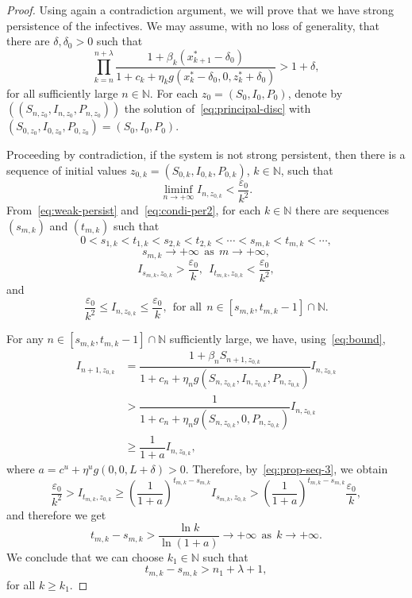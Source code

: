 \documentclass[reqno]{amsart}
\renewcommand{\le}{\leqslant}
\renewcommand{\ge}{\geqslant}
\newcommand{\eps}{\varepsilon}
\newcommand{\N}{\ensuremath{\mathds N}}
\begin{document}
{{\begin{proof}
Using again a contradiction argument, we will prove that we have strong persistence of the infectives. We may assume, with no loss of generality, that
there are $\delta,\delta_0>0$ such that
\begin{equation}\label{eq:condi-per2}
\prod_{k=n}^{n+\lambda} \dfrac{1+\beta_k(x^*_{k+1}-\delta_0)}{1+c_k+\eta_kg(x^*_k-\delta_0,0,z^*_k+\delta_0)}>1+\delta,
\end{equation}
for all sufficiently large $n \in \N$. For each $z_0=(S_0,I_0,P_0)$, denote by $((S_{n,z_0},I_{n,z_0},P_{n,z_0}))$ the solution of~\eqref{eq:principal-disc}  with {$(S_{0,z_0},I_{0,z_0},P_{0,z_0})=(S_0,I_0,P_0)$}.

Proceeding by contradiction, if the system is not strong persistent, then there is a sequence of initial values $z_{0,k}=(S_{0,k},I_{0,k},P_{0,k})$, $k \in\N$, such that
    \begin{equation}\label{eq:contrad-2}
    \liminf_{n \to +\infty} I_{n,z_{0,k}} < \frac{\eps_0}{k^2}.
    \end{equation}
From~\eqref{eq:weak-persist} and~\eqref{eq:condi-per2}, for each $k \in\N$ there are sequences $(s_{m,k})$ and $(t_{m,k})$ such that
\begin{equation}\label{eq:prop-seq-1}
0<s_{1,k}<t_{1,k}<s_{2,k}<t_{2,k}<\cdots<s_{m,k}<t_{m,k}<\cdots,
\end{equation}
\begin{equation}\label{eq:prop-seq-2}
s_{m,k} \to +\infty \ \ \text{as} \ \ m \to +\infty,
\end{equation}
\begin{equation}\label{eq:prop-seq-3}
I_{s_{m,k},z_{0,k}}>\dfrac{\eps_0}{k}, \ \  I_{t_{m,k},z_{0,k}}<\dfrac{\eps_0}{k^2},
\end{equation}
and
\begin{equation}\label{eq:prop-seq-4}
\frac{\eps_0}{k^2}\le I_{n,z_{0,k}}\le \frac{\eps_0}{k}, \ \  \text{for all} \ \ n \in [s_{m,k},t_{m,k}-1]\cap\N.
\end{equation}

For any $n \in [s_{m,k},t_{m,k}-1]\cap\N$ sufficiently large, we have, using~\eqref{eq:bound},
\[
\begin{split}
I_{n+1,z_{0,k}}
&=\dfrac{1+\beta_nS_{n+1,z_{0,k}}}{1+c_n+\eta_n g(S_{n,z_{0,k}},I_{n,z_{0,k}},P_{n,z_{0,k}})}I_{n,z_{0,k}}\\
& > \dfrac{1}{1+c_n+\eta_n g(S_{n,z_{0,k}},0,P_{n,z_{0,k}})}I_{n,z_{0,k}}\\
& \ge\dfrac{1}{1+a}I_{n,z_{0,k}},
\end{split}
\]
where $a=c^u+\eta^u g(0,0,L+\delta)>0$. Therefore, by~\eqref{eq:prop-seq-3}, we obtain
$$
\frac{\eps_0}{k^2} > I_{t_{m,k},z_{0,k}} \ge \left(\dfrac{1}{1+a}\right)^{t_{m,k}-s_{m,k}} I_{s_{m,k},z_{0,k}}
> \left(\dfrac{1}{1+a}\right)^{t_{m,k}-s_{m,k}} \frac{\eps_0}{k},
$$
and therefore we get
$$t_{m,k}-s_{m,k} > \dfrac{\ln k}{\ln(1+a)}\to +\infty \ \ \text{as} \ \ k \to +\infty. $$
We conclude that we can choose $k_1 \in \N$ such that
$$t_{m,k}-s_{m,k} > n_1+\lambda+1,$$
for all $k \ge k_1$.


\end{proof}}}
\end{document}
